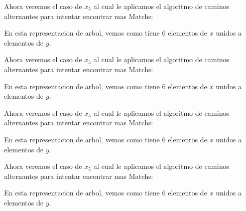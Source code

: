 \documentclass[letterpaper,10pt]{article}
\begin{document}
\begin{enumerate}[1.]
Ahora veremos el caso de $x_{5}$ al cual le aplicamos el algoritmo de caminos alternantes para intentar encontrar mas Matchs:
\\
\newline
\begin{minipage}[t]{0.6\textwidth}

\end{minipage}
En esta representacion de arbol, vemos como tiene 6 elementos de $x$ unidos a elementos de $y$.\\
\newline



Ahora veremos el caso de $x_{5}$ al cual le aplicamos el algoritmo de caminos alternantes para intentar encontrar mas Matchs:
\\
\newline
\begin{minipage}[t]{0.6\textwidth}

\end{minipage}
En esta representacion de arbol, vemos como tiene 6 elementos de $x$ unidos a elementos de $y$.\\
\newline



Ahora veremos el caso de $x_{5}$ al cual le aplicamos el algoritmo de caminos alternantes para intentar encontrar mas Matchs:
\\
\newline
\begin{minipage}[t]{0.6\textwidth}

\end{minipage}
En esta representacion de arbol, vemos como tiene 6 elementos de $x$ unidos a elementos de $y$.\\
\newline



Ahora veremos el caso de $x_{5}$ al cual le aplicamos el algoritmo de caminos alternantes para intentar encontrar mas Matchs:
\\
\newline
\begin{minipage}[t]{0.6\textwidth}

\end{minipage}
En esta representacion de arbol, vemos como tiene 6 elementos de $x$ unidos a elementos de $y$.\\
\newline




\end{enumerate}
\end{document}
